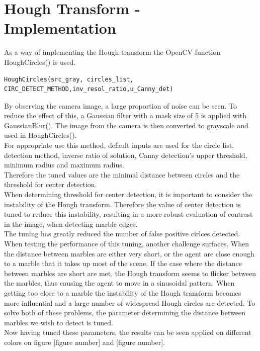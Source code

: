 \documentclass[../../../../main.tex]{subfile}
\begin{document}
\section{Hough Transform - Implementation}

As a way of implementing the Hough transform the OpenCV function HoughCircles() is used.

\begin{lstlisting}
HoughCircles(src_gray, circles_list, CIRC_DETECT_METHOD,inv_resol_ratio,u_Canny_det)
\end{lstlisting}

By observing the camera image, a large proportion of noise can be seen. To reduce the effect of this, a Gaussian filter with a mask size of 5 is applied with GaussianBlur().
The image from the camera is then converted to grayscale and used in HoughCircles(). \\

For appropriate use this method, default inputs are used for the circle list, detection method, inverse ratio of solution, Canny detection's upper threshold, minimum radius and maximum radius.\\

Therefore the tuned values are the minimal distance between circles and the threshold for center detection.\\

When determining threshold for center detection, it is important to consider the instability of the Hough transform. Therefore the value of center detection is tuned to reduce this instability, resulting in a more robust evaluation of contrast in the image, when detecting marble edges.\\

The tuning has greatly reduced the number of false positive cirlces detected. When testing the performance of this tuning, another challenge surfaces.
When the distance between marbles are either very short, or the agent are close enough to a marble that it takes up most of the scene. If the case where the distance between marbles are short are met, the Hough transform seems to flicker between the marbles, thus causing the agent to move in a sinusoidal pattern. When getting too close to a marble the instability of the Hough transform becomes more influential and a large number of widespread Hough circles are detected. To solve both of these problems, the parameter determining the distance between marbles we wish to detect is tuned.\\
Now having tuned these parameters, the results can be seen applied on different colors on figure [figure number] and [figure number].
\end{document}
